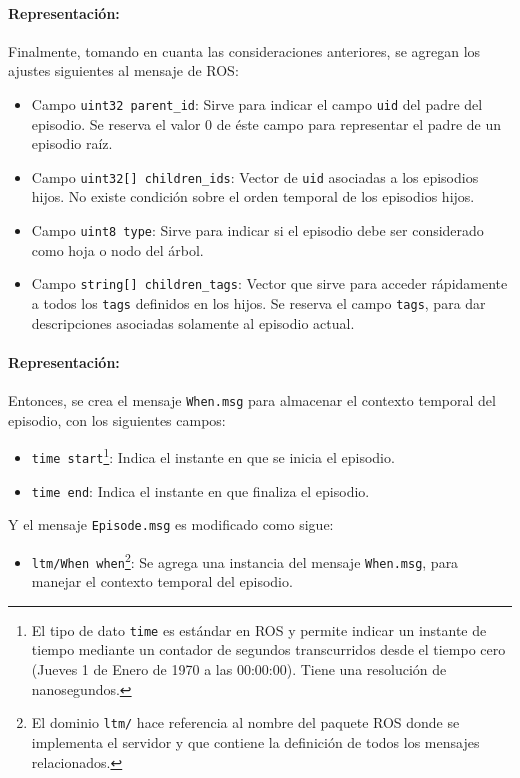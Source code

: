 \paragraph{Representación:}
Finalmente, tomando en cuanta las consideraciones anteriores, se agregan los ajustes siguientes al mensaje de ROS:
\begin{itemize}
	\item Campo \texttt{uint32 parent\_id}: Sirve para indicar el campo \texttt{uid} del padre del episodio. Se reserva el valor $0$ de éste campo para representar el padre de un episodio raíz.
	\item Campo \texttt{uint32[] children\_ids}: Vector de \texttt{uid} asociadas a los episodios hijos. No existe condición sobre el orden temporal de los episodios hijos.
	\item Campo \texttt{uint8 type}: Sirve para indicar si el episodio debe ser considerado como hoja o nodo del árbol.
	\item Campo \texttt{string[] children\_tags}: Vector que sirve para acceder rápidamente a todos los \texttt{tags} definidos en los hijos. Se reserva el campo \texttt{tags}, para dar descripciones asociadas solamente al episodio actual.
\end{itemize}

\paragraph{Representación:}
Entonces, se crea el mensaje \texttt{When.msg} para almacenar el contexto temporal del episodio, con los siguientes campos:
\begin{itemize}
	\item \texttt{time start}\footnote{El tipo de dato \texttt{time} es estándar en ROS y permite indicar un instante de tiempo mediante un contador de segundos transcurridos desde el tiempo cero (Jueves 1 de Enero de 1970 a las 00:00:00). Tiene una resolución de nanosegundos.}: Indica el instante en que se inicia el episodio.
	\item \texttt{time end}: Indica el instante en que finaliza el episodio.
\end{itemize}

Y el mensaje \texttt{Episode.msg} es modificado como sigue:
\begin{itemize}
	\item \texttt{ltm/When when}\footnote{El dominio \texttt{ltm/} hace referencia al nombre del paquete ROS donde se implementa el servidor y que contiene la definición de todos los mensajes relacionados.}: Se agrega una instancia del mensaje \texttt{When.msg}, para manejar el contexto temporal del episodio.
\end{itemize}



